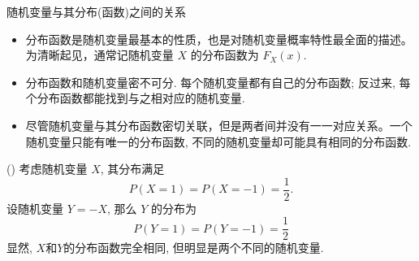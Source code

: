\documentclass[Prob-All.tex]{subfiles}
\begin{document}
\begin{frame}{随机变量与其分布(函数)之间的关系}
\begin{itemize}[<+-|alert@+>]
	\item 分布函数是随机变量最基本的性质，也是对随机变量概率特性最全面的描述。为清晰起见，通常记随机变量 $X$ 的分布函数为 $F_{X}(x)$.
	\item 分布函数和随机变量密不可分. 每个随机变量都有自己的分布函数; 反过来, 每个分布函数都能找到与之相对应的随机变量.
	\item 尽管随机变量与其分布函数密切关联，但是两者间并没有一一对应关系。一个随机变量只能有唯一的分布函数, 不同的随机变量却可能具有相同的分布函数.

\end{itemize}
\pause
\begin{exam}
  () 考虑随机变量 $X$, 其分布满足
	\[
	P(X=1)=P(X=-1)=\frac{1}{2}.
	\]\pause
	设随机变量 $Y=-X$, 那么 $Y$ 的分布为
	\[
	P(Y=1)=P(Y=-1)=\frac{1}{2}
	\]\pause
	显然, $X$和$Y$的分布函数完全相同, 但明显是两个不同的随机变量.
\end{exam}


\end{frame}
\end{document}

